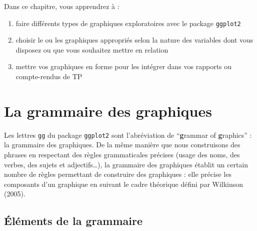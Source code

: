 \documentclass[
  letterpaper,
  DIV=11,
  numbers=noendperiod]{scrreprt}
\providecommand{\tightlist}{%
  \setlength{\itemsep}{0pt}\setlength{\parskip}{0pt}}\usepackage{longtable,booktabs,array}
\begin{document}
\begin{tcolorbox}[enhanced jigsaw, bottomtitle=1mm, title=\textcolor{quarto-callout-tip-color}{\faLightbulb}\hspace{0.5em}{Objectifs}, breakable, opacitybacktitle=0.6, coltitle=black, opacityback=0, toprule=.15mm, toptitle=1mm, titlerule=0mm, colback=white, rightrule=.15mm, arc=.35mm, leftrule=.75mm, bottomrule=.15mm, left=2mm, colframe=quarto-callout-tip-color-frame, colbacktitle=quarto-callout-tip-color!10!white]

Dans ce chapitre, vous apprendrez à :

\begin{enumerate}
\def\labelenumi{\arabic{enumi}.}
\tightlist
\item
  faire différents types de graphiques exploratoires avec le package
  \texttt{ggplot2}  
   
\item
  choisir le ou les graphiques appropriés selon la nature des variables
  dont vous disposez ou que vous souhaitez mettre en relation
\item
  mettre vos graphiques en forme pour les intégrer dans vos rapports ou
  compte-rendus de TP
\end{enumerate}

\end{tcolorbox}

\hypertarget{sec-gggraph}{%
\section{La grammaire des graphiques}\label{sec-gggraph}}

Les lettres \texttt{gg} du package \texttt{ggplot2} sont l'abréviation
de ``\textbf{g}rammar of \textbf{g}raphics'' : la grammaire des
graphiques. De la même manière que nous construisons des phrases en
respectant des règles grammaticales précises (usage des noms, des
verbes, des sujets et adjectifs\ldots), la grammaire des graphiques
établit un certain nombre de règles permettant de construire des
graphiques : elle précise les composants d'un graphique en suivant le
cadre théorique défini par Wilkinson (2005).

\hypertarget{uxe9luxe9ments-de-la-grammaire}{%
\subsection{Éléments de la
grammaire}\label{uxe9luxe9ments-de-la-grammaire}}
\end{document}
